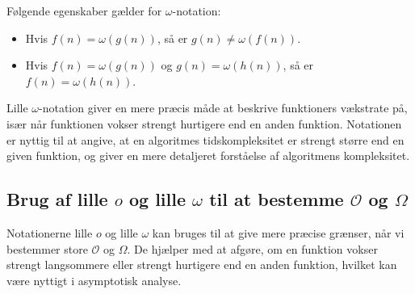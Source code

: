 Følgende egenskaber gælder for $\omega$-notation:
\begin{itemize}
    \item Hvis $f(n) = \omega(g(n))$, så er $g(n) \neq \omega(f(n))$.
    \item Hvis $f(n) = \omega(g(n))$ og $g(n) = \omega(h(n))$, så er $f(n) = \omega(h(n))$.
\end{itemize}


Lille $\omega$-notation giver en mere præcis måde at beskrive funktioners vækstrate på, især når funktionen vokser strengt hurtigere end en anden funktion. Notationen er nyttig til at angive, at en algoritmes tidskompleksitet er strengt større end en given funktion, og giver en mere detaljeret forståelse af algoritmens kompleksitet. 

\subsection*{Brug af lille \texorpdfstring{$o$}{o} og lille \texorpdfstring{$\omega$}{omega} til at bestemme \texorpdfstring{$\mathcal{O}$}{O} og \texorpdfstring{$\Omega$}{Omega}}
Notationerne lille $o$ og lille $\omega$ kan bruges til at give mere præcise grænser, når vi bestemmer store $\mathcal{O}$ og $\Omega$. De hjælper med at afgøre, om en funktion vokser strengt langsommere eller strengt hurtigere end en anden funktion, hvilket kan være nyttigt i asymptotisk analyse.

